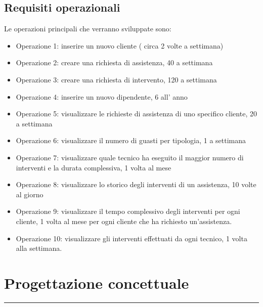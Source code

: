 \documentclass[legalpaper]{article}
\begin{document}
\subsection{Requisiti operazionali}
Le operazioni principali che verranno sviluppate sono:
\begin{itemize}
    \item Operazione 1: inserire un nuovo cliente ( circa 2 volte a settimana)
    \item Operazione 2: creare una richiesta di assistenza, 40 a settimana
    \item Operazione 3: creare una richiesta di intervento, 120 a settimana
    \item Operazione 4: inserire un nuovo dipendente, 6 all' anno
    \item Operazione 5: visualizzare le richieste di assistenza di uno specifico cliente, 20 a settimana
    \item Operazione 6: visualizzare il numero di guasti per tipologia, 1 a settimana
    \item Operazione 7: visualizzare quale tecnico ha eseguito il maggior numero di interventi e la durata complessiva, 1 volta al mese
    \item Operazione 8: visualizzare lo storico degli interventi di un assistenza, 10 volte al giorno
    \item Operazione 9: visualizzare il tempo complessivo degli interventi per ogni cliente, 1 volta al mese per ogni cliente che ha richiesto un'assistenza.
    \item Operazione 10: visualizzare gli interventi effettuati da ogni tecnico, 1 volta alla settimana.
\end{itemize}


\newpage
\section{Progettazione concettuale}
\rule{\linewidth}{1.5pt}
\end{document}
